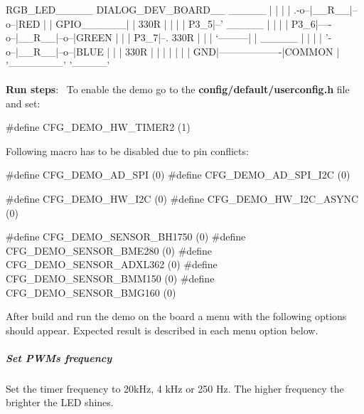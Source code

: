 \begin{DoxyPre}
                                         RGB\_LED\_\_\_\_\_
   DIALOG\_DEV\_BOARD\_\_         \_\_\_\_\_      |           |
   |                 |  .-o--|\_\_R\_\_|--o--|RED        |
   |       GPIO\_\_\_\_\_\_|  |     330R       |           |
   |       |     P3\_5|--'     \_\_\_\_\_      |           |
   |       |     P3\_6|----o--|\_\_R\_\_|--o--|GREEN      |
   |       |     P3\_7|--.     330R       |           |
   |       `---------|  |     \_\_\_\_\_      |           |
   |                 |  '-o--|\_\_R\_\_|--o--|BLUE       |
   |                 |        330R       |           |
   |                 |                   |           |
   |              GND|-------------------|COMMON     |
   '-----------------'                   '-----------'
\end{DoxyPre}



\begin{DoxyItemize}
\item {\bfseries Run steps}\+:~\newline
 To enable the demo go to the {\bfseries {\ttfamily config/default/userconfig.\+h}} file and set\+: 
\begin{DoxyCode}
\textcolor{preprocessor}{#define CFG\_DEMO\_HW\_TIMER2      (1)}
\end{DoxyCode}
 Following macro has to be disabled due to pin conflicts\+: 
\begin{DoxyCode}
\textcolor{preprocessor}{#define CFG\_DEMO\_AD\_SPI         (0)}
\textcolor{preprocessor}{#define CFG\_DEMO\_AD\_SPI\_I2C     (0)}

\textcolor{preprocessor}{#define CFG\_DEMO\_HW\_I2C         (0)}
\textcolor{preprocessor}{#define CFG\_DEMO\_HW\_I2C\_ASYNC   (0)}

\textcolor{preprocessor}{#define CFG\_DEMO\_SENSOR\_BH1750  (0)}
\textcolor{preprocessor}{#define CFG\_DEMO\_SENSOR\_BME280  (0)}
\textcolor{preprocessor}{#define CFG\_DEMO\_SENSOR\_ADXL362 (0)}
\textcolor{preprocessor}{#define CFG\_DEMO\_SENSOR\_BMM150  (0)}
\textcolor{preprocessor}{#define CFG\_DEMO\_SENSOR\_BMG160  (0)}
\end{DoxyCode}
 After build and run the demo on the board a menu with the following options should appear. Expected result is described in each menu option below.
\end{DoxyItemize}

\subparagraph*{Set P\+W\+Ms frequency}

Set the timer frequency to 20k\+Hz, 4 k\+Hz or 250 Hz. The higher frequency the brighter the L\+E\+D shines.

